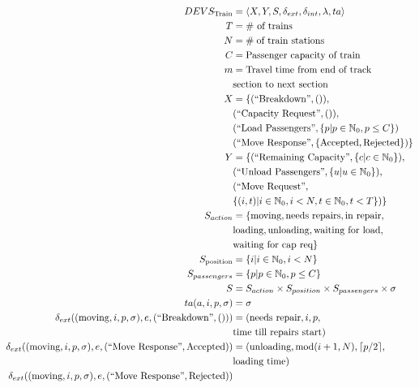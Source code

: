 \begin{align*}
DEVS_{\textrm{Train}} &= \left<X,Y,S,\delta_{ext},\delta_{int},\lambda,ta\right> \\
    T &= \text{\# of trains} \\
    N &= \# \text{\;of train stations} \\
    C &= \text{Passenger capacity of train} \\
    m &= \text{Travel time from end of track} \\
        & \text{section to next section} \\
    X &= \{
      \InBreakDown, \\
      &  \InCapReq, \\
      &  \InLoadPassengers{\{ p | p \in \mathbb{N}_0, p \leq C \}} \\
      &  \InMoveRes{\{ \text{Accepted}, \text{Rejected} \}}
    \} \\
    Y &= \{
      \OutRemainingCapacity{\{ c | c \in \mathbb{N}_0 \}}, \\
      &  \OutUnloadPassengers{\{ u | u \in \mathbb{N}_0 \}}, \\
      &  \OutMoveReq{\\ 
        & \{ (i, t) | i \in \mathbb{N}_0, i < N, t \in \mathbb{N}_0, t < T \}}
    \} \\
    S_{action} &= \{
      \text{moving}, \text{needs repairs}, \text{in repair}, \\
      &  \text{loading}, \text{unloading}, \text{waiting for load}, \\
      &  \text{waiting for cap req} 
    \} \\
    S_{\text{position}} &= \{ i | i \in \mathbb{N}_0, i < N
    \} \\
    S_{passengers} &= \{ p | p \in \mathbb{N}_0, p \leq C \} \\
    S &= S_{action} \times S_{position} \times S_{passengers} \times \sigma \\
    ta(a, i, p, \sigma) &= \sigma \\
    \delta_{ext}((\text{moving}, i, p, \sigma), e, \InBreakDown) &= 
        (\text{needs repair}, i, p, \\
        & \text{time till repairs start}) \\
    \delta_{ext}((\text{moving}, i, p, \sigma), e, \InMoveRes{\text{Accepted}})
        &= (\text{unloading}, \Mod{i+1}{N}, \ceil*{p/2}, \\
        & \text{loading time}) \\
    \delta_{ext}((\text{moving}, i, p, \sigma), e, \InMoveRes{\text{Rejected}})

\end{align*}
